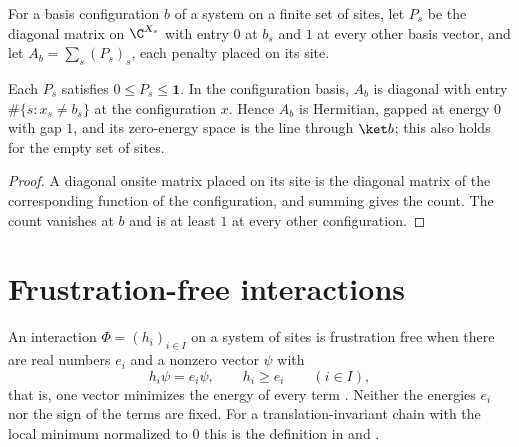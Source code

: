 \begin{definition}
    \label{def:hamiltonians_product_basis_penalty}
    \leanok
    For a basis configuration $b$ of a system on a finite set of sites, let $P_s$ be the
    diagonal matrix on $\C^{X_s}$ with entry $0$ at $b_s$ and $1$ at every other basis vector,
    and let $A_b=\sum_s(P_s)_s$, each penalty placed on its site.
\end{definition}

\begin{lemma}
    \label{lem:hamiltonians_product_basis_penalty}
    \leanok
    Each $P_s$ satisfies $0\le P_s\le\mathbf{1}$. In the configuration basis, $A_b$ is diagonal
    with entry $\#\{s:x_s\neq b_s\}$ at the configuration $x$. Hence $A_b$ is Hermitian, gapped
    at energy $0$ with gap $1$, and its zero-energy space is the line through $\ket b$; this also
    holds for the empty set of sites.
\end{lemma}
\begin{proof}
    \leanok
    A diagonal onsite matrix placed on its site is the diagonal matrix of the corresponding
    function of the configuration, and summing gives the count. The count vanishes at $b$ and
    is at least $1$ at every other configuration.
\end{proof}

\section{Frustration-free interactions}
\label{sec:hamiltonians_frustration_free}

\begin{definition}
    \label{def:hamiltonians_frustration_free}
    \leanok
    An interaction $\Phi=(h_i)_{i\in I}$ on a system of sites is frustration free
    when there are real numbers $e_i$ and a nonzero vector $\psi$ with
    \[
        h_i\psi=e_i\psi,\qquad h_i\ge e_i\qquad(i\in I),
    \]
    that is, one vector minimizes the energy of every term
    \cite[line 537]{Cirac2021Matrix}. Neither the energies $e_i$ nor the sign
    of the terms are fixed. For a translation-invariant chain with the local
    minimum normalized to $0$ this is the definition in
    \cite[lines 796--808]{Sanz2010Quantum} and \cite[lines 311--326]{PerezGarcia2007Matrix}.
\end{definition}

